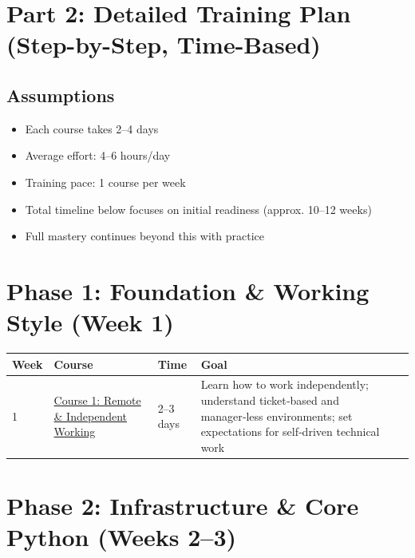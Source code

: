 \documentclass[12pt]{article}
\begin{document}
	\section*{Part 2: Detailed Training Plan (Step-by-Step, Time-Based)}
	
	\subsection*{Assumptions}
	\begin{itemize}
		\item Each course takes 2–4 days
		\item Average effort: 4–6 hours/day
		\item Training pace: 1 course per week
		\item Total timeline below focuses on initial readiness (approx. 10–12 weeks)
		\item Full mastery continues beyond this with practice
	\end{itemize}
	
	\vspace{0.5cm}
	
	\section*{Phase 1: Foundation \& Working Style (Week 1)}
	
	\begin{tabularx}{\textwidth}{|X|p{3cm}|p{3cm}|X|}
		\hline
		\textbf{Week} & \textbf{Course} & \textbf{Time} & \textbf{Goal} \\
		\hline
		1 & \href{https://www.udemy.com/course/remote-independent-working-in-a-managerless-environment-101/}{Course 1: Remote \& Independent Working} & 2–3 days & Learn how to work independently; understand ticket‑based and manager‑less environments; set expectations for self‑driven technical work \\
		\hline
	\end{tabularx}
	
	\vspace{0.3cm}
	
\section*{Phase 2: Infrastructure \& Core Python (Weeks 2–3)}
\end{document}
